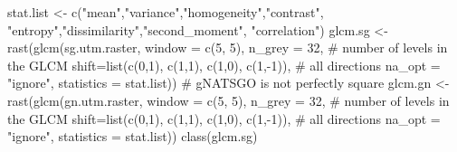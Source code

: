 \documentclass[
  letterpaper,
  DIV=11,
  numbers=noendperiod]{scrartcl}
\newenvironment{Shaded}{\begin{snugshade}}{\end{snugshade}}
\newcommand{\AttributeTok}[1]{\textcolor[rgb]{0.40,0.45,0.13}{#1}}
\newcommand{\CommentTok}[1]{\textcolor[rgb]{0.37,0.37,0.37}{#1}}
\newcommand{\DecValTok}[1]{\textcolor[rgb]{0.68,0.00,0.00}{#1}}
\newcommand{\FunctionTok}[1]{\textcolor[rgb]{0.28,0.35,0.67}{#1}}
\newcommand{\NormalTok}[1]{\textcolor[rgb]{0.00,0.23,0.31}{#1}}
\newcommand{\OtherTok}[1]{\textcolor[rgb]{0.00,0.23,0.31}{#1}}
\newcommand{\SpecialCharTok}[1]{\textcolor[rgb]{0.37,0.37,0.37}{#1}}
\newcommand{\StringTok}[1]{\textcolor[rgb]{0.13,0.47,0.30}{#1}}
\begin{document}
\begin{Shaded}
\begin{Highlighting}[]
\NormalTok{stat.list }\OtherTok{\textless{}{-}} \FunctionTok{c}\NormalTok{(}\StringTok{"mean"}\NormalTok{,}\StringTok{"variance"}\NormalTok{,}\StringTok{"homogeneity"}\NormalTok{,}\StringTok{"contrast"}\NormalTok{,}
               \StringTok{"entropy"}\NormalTok{,}\StringTok{"dissimilarity"}\NormalTok{,}\StringTok{"second\_moment"}\NormalTok{,}
               \StringTok{"correlation"}\NormalTok{)}
\NormalTok{glcm.sg }\OtherTok{\textless{}{-}} \FunctionTok{rast}\NormalTok{(}\FunctionTok{glcm}\NormalTok{(sg.utm.raster,}
                   \AttributeTok{window =} \FunctionTok{c}\NormalTok{(}\DecValTok{5}\NormalTok{, }\DecValTok{5}\NormalTok{),}
                   \AttributeTok{n\_grey =} \DecValTok{32}\NormalTok{, }\CommentTok{\# number of levels in the GLCM}
                   \AttributeTok{shift=}\FunctionTok{list}\NormalTok{(}\FunctionTok{c}\NormalTok{(}\DecValTok{0}\NormalTok{,}\DecValTok{1}\NormalTok{), }\FunctionTok{c}\NormalTok{(}\DecValTok{1}\NormalTok{,}\DecValTok{1}\NormalTok{), }\FunctionTok{c}\NormalTok{(}\DecValTok{1}\NormalTok{,}\DecValTok{0}\NormalTok{), }\FunctionTok{c}\NormalTok{(}\DecValTok{1}\NormalTok{,}\SpecialCharTok{{-}}\DecValTok{1}\NormalTok{)), }\CommentTok{\# all directions}
                   \AttributeTok{na\_opt =} \StringTok{"ignore"}\NormalTok{,}
                   \AttributeTok{statistics =}\NormalTok{ stat.list))}
\CommentTok{\# gNATSGO is not perfectly square}
\NormalTok{glcm.gn }\OtherTok{\textless{}{-}} \FunctionTok{rast}\NormalTok{(}\FunctionTok{glcm}\NormalTok{(gn.utm.raster,}
                   \AttributeTok{window =} \FunctionTok{c}\NormalTok{(}\DecValTok{5}\NormalTok{, }\DecValTok{5}\NormalTok{),}
                   \AttributeTok{n\_grey =} \DecValTok{32}\NormalTok{, }\CommentTok{\# number of levels in the GLCM}
                   \AttributeTok{shift=}\FunctionTok{list}\NormalTok{(}\FunctionTok{c}\NormalTok{(}\DecValTok{0}\NormalTok{,}\DecValTok{1}\NormalTok{), }\FunctionTok{c}\NormalTok{(}\DecValTok{1}\NormalTok{,}\DecValTok{1}\NormalTok{), }\FunctionTok{c}\NormalTok{(}\DecValTok{1}\NormalTok{,}\DecValTok{0}\NormalTok{), }\FunctionTok{c}\NormalTok{(}\DecValTok{1}\NormalTok{,}\SpecialCharTok{{-}}\DecValTok{1}\NormalTok{)), }\CommentTok{\# all directions}
                   \AttributeTok{na\_opt =} \StringTok{"ignore"}\NormalTok{,}
                   \AttributeTok{statistics =}\NormalTok{ stat.list))}
\FunctionTok{class}\NormalTok{(glcm.sg)}
\end{Highlighting}
\end{Shaded}
\end{document}
